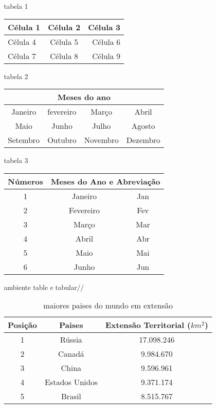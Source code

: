 \documentclass[12pt, a4paper, oneside]{book}
\begin{document}
tabela 1
\begin{tabular}{|l|c|r|} \hline
Célula 1 & Célula 2 & Célula 3 \\ \hline
Célula 4 & Célula 5 & Célula 6 \\ \hline
Célula 7 & Célula 8 & Célula 9 \\ \hline
\end{tabular}

\vspace{2cm}
tabela 2
\begin{tabular}{|c|c|c|c|}\hline
\multicolumn{4}{|c|}{Meses do ano}\\ \hline 
Janeiro & fevereiro & Março & Abril\\ \hline
Maio & Junho & Julho & Agosto\\ \hline
Setembro & Outubro & Novembro & Dezembro\\ \hline
\end{tabular}

\vspace{2cm}
tabela 3\\
\vspace{2cm}
\begin{tabular}{|c|cc|} \hline 
Números & \multicolumn{2}{|c|}{Meses do Ano e Abreviação}\\ \hline
1 & Janeiro & Jan\\ \cline{2-3} %
2 & Fevereiro & Fev\\ \cline{2-3}
3 & Março & Mar\\ \cline{2-3}
4 & Abril & Abr\\ \cline{2-3}
5 & Maio & Mai\\ \cline{2-3}
6 & Junho & Jun\\ \hline
\end{tabular}

ambiente table e tabular//

\begin{table}[h]
\centering  %
\caption{maiores paises do mundo em extensão} %
\vspace{0.5cm}
\begin{tabular}{c|cc}
Posição & Paises & Extensão Territorial ($km^{2}$)\\
\hline
1 & Rússia &          17.098.246\\
2 & Canadá &           9.984.670\\
3 & China &            9.596.961\\
4 & Estados Unidos &   9.371.174\\
5 & Brasil &           8.515.767\\
\end{tabular}
\end{table}
\end{document}
